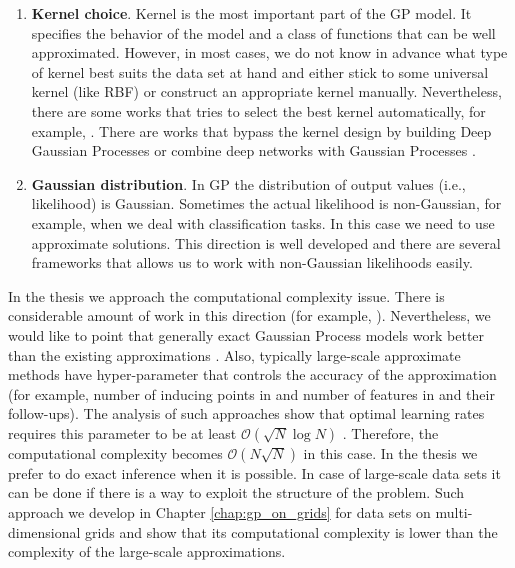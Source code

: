 \begin{enumerate}
    \item \textbf{Kernel choice}. Kernel is the most important part of the GP model.
    It specifies the behavior of the model and a class of functions that can be
    well approximated.
    However, in most cases, we do not know in advance what type of kernel
    best suits the data set at hand and either stick to some universal kernel (like RBF)
    or construct an appropriate kernel manually.
    Nevertheless, there are some works that tries to select the best kernel automatically, for example, \citep{duvenaud2014automatic, abdessalem2017automatic, teng2020scalable}.
    There are works that bypass the kernel design by building Deep Gaussian Processes \citep{damianou2013deep} or
    combine deep networks with Gaussian Processes \citep{wilson2016stochastic}.

    \item \textbf{Gaussian distribution}.
    In GP the distribution of output values (i.e., likelihood) is Gaussian.
    Sometimes the actual likelihood is non-Gaussian, for example, when we deal
    with classification tasks.
    In this case we need to use approximate solutions.
    This direction is well developed and there are several frameworks
    that allows us to work with non-Gaussian likelihoods \citep{de2017gpflow,gardner2018gpytorch} easily.

\end{enumerate}

In the thesis we approach the computational complexity issue.
There is considerable amount of work in this direction
(for example, \citep{quinonero2005unifying,rahimi2008random,titsias2009variational,cutajar2017random}).
Nevertheless, we would like to point that
generally exact Gaussian Process models work better than the existing approximations
\citep{cutajar2016preconditioning,wang2019exact}.
Also, typically large-scale approximate methods have hyper-parameter that controls
the accuracy of the approximation (for example, number of inducing points in \citep{quinonero2005unifying,titsias2009variational}
and number of features in \citep{rahimi2008random,felix2016orthogonal} and their follow-ups).
The analysis of such approaches show that optimal learning rates requires this parameter to be at least $\mathcal{O}(\sqrt{N} \log N)$
\citep{aless2016generalization,rudi2017falkon}.
Therefore, the computational complexity becomes $\mathcal{O}(N\sqrt{N})$ in this case.
In the thesis we prefer to do exact inference when it is possible.
In case of large-scale data sets it can be done if there is a way
to exploit the structure of the problem.
Such approach we develop in Chapter \ref{chap:gp_on_grids} for data sets on multi-dimensional grids
and show that its computational complexity is lower than the complexity of the large-scale approximations.


